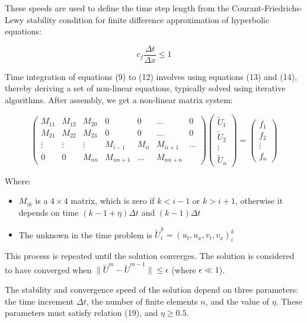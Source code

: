 \documentclass{mcmthesis}  %
\begin{document}
These speeds are used to define the time step length from the Courant-Friedrichs-Lewy stability condition for finite difference approximation of hyperbolic equations:

\begin{equation}
c_f \frac{\Delta t}{\Delta x} \leq 1
\end{equation}

Time integration of equations (9) to (12) involves using equations (13) and (14), thereby deriving a set of non-linear equations, typically solved using iterative algorithms. After assembly, we get a non-linear matrix system:

\begin{equation}
\begin{pmatrix}
M_{11} & M_{12} & M_{20} & 0 & 0 & \ldots & 0 \\
M_{21} & M_{22} & M_{23} & 0 & 0 & \ldots & 0 \\
\vdots & \vdots & \vdots & M_{i-1} & M_{ii} & M_{ii+1} & \ldots \\
0 & 0 & M_{nn} & M_{nn+1} & \ldots & M_{nn+n}
\end{pmatrix}
\begin{pmatrix}
\tilde{U}_1 \\
\tilde{U}_2 \\
\vdots \\
\tilde{U}_n
\end{pmatrix} =
\begin{pmatrix}
f_1 \\
f_2 \\
\vdots \\
f_n
\end{pmatrix}
\end{equation}

Where:

\begin{itemize}
    \item $M_{ik}$ is a $4 \times 4$ matrix, which is zero if $k < i - 1$ or $k > i + 1$, otherwise it depends on time $(k - 1 + \eta)\Delta t$ and $(k - 1)\Delta t$
    \item The unknown in the time problem is $\tilde{U}_i^k = (u_t, u_x, v_t, v_x)_i^k$
\end{itemize}

This process is repeated until the solution converges. The solution is considered to have converged when $\|\tilde{U}^m - \tilde{U}^{m-1}\| \leq \epsilon$ (where $\epsilon \ll 1$).

The stability and convergence speed of the solution depend on three parameters: the time increment $\Delta t$, the number of finite elements $n$, and the value of $\eta$. These parameters must satisfy relation (19), and $\eta \geq 0.5$.
\end{document}
